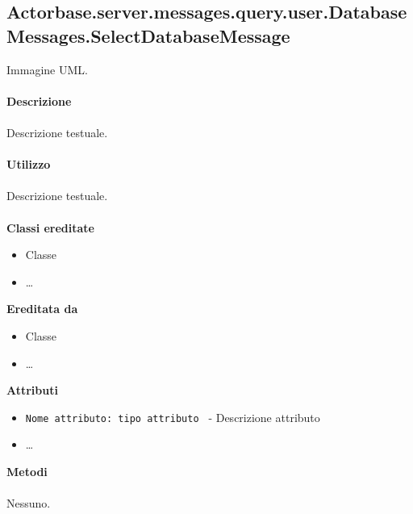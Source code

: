 \documentclass[a4paper]{article}
\begin{document}
	\subsection{Actorbase.server.messages.query.user.DatabaseMessages.SelectDatabaseMessage}
		Immagine UML.
		\\ \\
		\textbf{Descrizione}
			\\ \\
			Descrizione testuale.
			\\ \\
		\textbf{Utilizzo}
			\\ \\
			Descrizione testuale.
			\\ \\
		\textbf{Classi ereditate}
			\begin{itemize}
				\item Classe
				\item \dots
			\end{itemize}
		\textbf{Ereditata da}
			\begin{itemize}
				\item Classe
				\item \dots
			\end{itemize}
		\textbf{Attributi}
			\begin{itemize}
				\item \texttt{Nome attributo: tipo attributo } - Descrizione attributo
				\item \dots
			\end{itemize}
		\textbf{Metodi}
			\\ \\
			Nessuno.		
			
\end{document}
